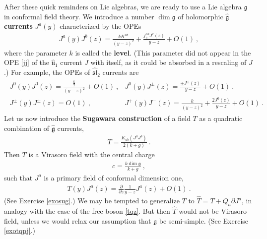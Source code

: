 \documentclass[12pt,a4paper,notitlepage]{report}
\numberwithin{equation}{section}
\theoremstyle{break}
\begin{document}
After these quick reminders on Lie algebras, we are ready to use a Lie algebra $\mathfrak{g}$ in conformal field theory. 
We introduce a number $\dim \mathfrak{g}$ of holomorphic \textbf{\boldmath $\hat{\mathfrak{g}}$ currents} $J^a(y)$ characterized by the OPEs 
\begin{align}
 \boxed{ J^a(y) J^b(z) = \frac{k K^{ab}}{(y-z)^2} +  \frac{ f^{ab}_c J^c(z)}{y-z}  + O(1)} \ ,
\label{jajb}
\end{align}
where the parameter $k$ is called the \textbf{level}. (This parameter did not appear in the OPE \eqref{jj} of the $\hat{\mathfrak{u}}_1$ current $J$ with itself, as it could be absorbed in a rescaling of $J$.) For example, the OPEs of $\widehat{\mathfrak{sl}}_2$ currents are
\begin{align}
\begin{array}{ll}
  J^0(y)J^0(z) = \frac{\frac{k}{2}}{(y-z)^2} + O(1)\ ,  & J^0(y)J^\pm(z) = \frac{\pm J^\pm(z)}{y-z} + O(1)\ ,
\\
 J^\pm(y)J^\pm(z) = O(1) \ , & J^+(y)J^-(z) = \frac{k}{(y-z)^2} + \frac{2J^0(z)}{y-z} + O(1)\ .
\end{array}
\label{jjjj}
\end{align}
Let us now introduce the \textbf{\boldmath Sugawara construction} of a field $T$ as a quadratic combination of $\hat{\mathfrak{g}}$ currents,
\begin{align}
\boxed{ T =  \frac{ K_{ab} (J^aJ^b)}{2(k+g)} } \ .
\label{tjj} 
\end{align}
Then $T$ is a Virasoro field with the central charge 
\begin{align}
 \boxed{ c = \frac{ k \dim \mathfrak{g}}{k+g} }\ ,
\label{ckg}
\end{align}
such that $J^a$ is a primary field of conformal dimension one, 
\begin{align}
\boxed{ T(y)J^a(z) = {\frac{\partial}{\partial z}} \frac{1}{y-z} J^a(z) + O(1)} \ .
\label{tja}
\end{align}
(See Exercise \ref{exosug}.)
We may be tempted to generalize $T$ to $\hat{T} = T + Q_a\partial J^a$, in analogy with the case of the free boson \eqref{tqz}. 
But then $\hat{T}$ would not be Virasoro field, unless we would relax our assumption that $\mathfrak{g}$ be semi-simple. (See Exercise \ref{exotqpj}.)
\end{document}
